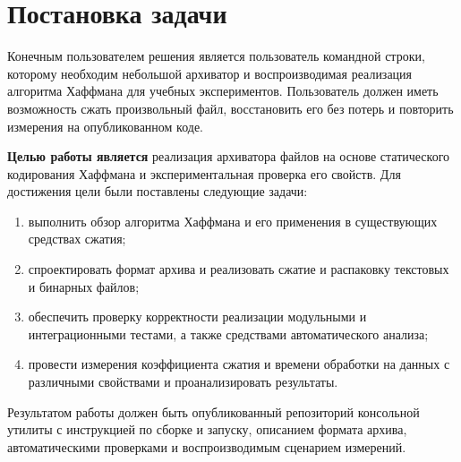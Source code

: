
\section{Постановка задачи}
\label{sec:task}

Конечным пользователем решения является пользователь командной строки,
которому необходим небольшой архиватор и воспроизводимая реализация алгоритма
Хаффмана для учебных экспериментов. Пользователь должен иметь возможность
сжать произвольный файл, восстановить его без потерь и повторить измерения на
опубликованном коде.

\textbf{Целью работы является} реализация архиватора файлов на основе
статического кодирования Хаффмана и экспериментальная проверка его свойств.
Для достижения цели были поставлены следующие задачи:
\begin{enumerate}
    \item выполнить обзор алгоритма Хаффмана и его применения в существующих
          средствах сжатия;
    \item спроектировать формат архива и реализовать сжатие и распаковку
          текстовых и бинарных файлов;
    \item обеспечить проверку корректности реализации модульными и
          интеграционными тестами, а также средствами автоматического анализа;
    \item провести измерения коэффициента сжатия и времени обработки на данных
          с различными свойствами и проанализировать результаты.
\end{enumerate}

Результатом работы должен быть опубликованный репозиторий консольной утилиты
с инструкцией по сборке и запуску, описанием формата архива, автоматическими
проверками и воспроизводимым сценарием измерений.

